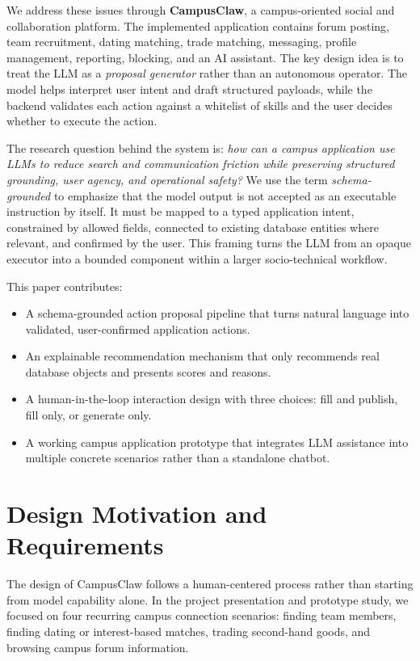 \documentclass[sigconf]{acmart}
\begin{document}
We address these issues through \textbf{CampusClaw}, a campus-oriented social and collaboration platform. The implemented application contains forum posting, team recruitment, dating matching, trade matching, messaging, profile management, reporting, blocking, and an AI assistant. The key design idea is to treat the LLM as a \emph{proposal generator} rather than an autonomous operator. The model helps interpret user intent and draft structured payloads, while the backend validates each action against a whitelist of skills and the user decides whether to execute the action.

The research question behind the system is: \emph{how can a campus application use LLMs to reduce search and communication friction while preserving structured grounding, user agency, and operational safety?} We use the term \emph{schema-grounded} to emphasize that the model output is not accepted as an executable instruction by itself. It must be mapped to a typed application intent, constrained by allowed fields, connected to existing database entities where relevant, and confirmed by the user. This framing turns the LLM from an opaque executor into a bounded component within a larger socio-technical workflow.

This paper contributes:
\begin{itemize}
    \item A schema-grounded action proposal pipeline that turns natural language into validated, user-confirmed application actions.
    \item An explainable recommendation mechanism that only recommends real database objects and presents scores and reasons.
    \item A human-in-the-loop interaction design with three choices: fill and publish, fill only, or generate only.
    \item A working campus application prototype that integrates LLM assistance into multiple concrete scenarios rather than a standalone chatbot.
\end{itemize}

\section{Design Motivation and Requirements}
The design of CampusClaw follows a human-centered process rather than starting from model capability alone. In the project presentation and prototype study, we focused on four recurring campus connection scenarios: finding team members, finding dating or interest-based matches, trading second-hand goods, and browsing campus forum information.
\end{document}
